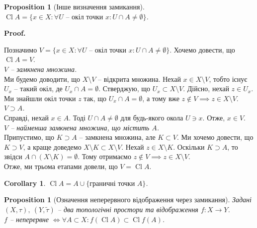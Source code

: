 \documentclass[a4paper, 10pt]{article}
\makeatletter
\theoremstyle{theoremdd}
\newtheorem{proposition}[theorem]{Proposition}
\newtheorem{corollary}[theorem]{Corollary}
\DeclareMathOperator{\Cl}{Cl}
\renewenvironment{proof}[1][Proof.\\]{\par
\pushQED{\hfill \qed}%
\normalfont \topsep6\p@\@plus6\p@\relax
\trivlist
\item\relax
{\bfseries
#1\@addpunct{.}}\hspace\labelsep\ignorespaces
}{%
\popQED\endtrivlist\@endpefalse
}
\makeatother
\begin{document}
\begin{proposition}[Інше визначення замикання]
$\Cl A = \{x \in X: \forall U \text{ -- окіл точки $x$}: U \cap A \neq \emptyset\}$.
\end{proposition}

\begin{proof}
Позначимо $V = \{x \in X: \forall U \text{ -- окіл точки $x$}: U \cap A \neq \emptyset\}$. Хочемо довести, що $\Cl A = V$.\\
\textit{$V$ -- замкнена множина.}\\
Ми будемо доводити, що $X \setminus V$ -- відкрита множина. Нехай $x \in X \setminus V$, тобто існує $U_x$ -- такий окіл, де $U_x \cap A = \emptyset$. Стверджую, що $U_x \subset X \setminus V$. Дійсно, нехай $z \in U_x$. Ми знайшли окіл точки $z$ так, що $U_x \cap A = \emptyset$, а тому вже $z \notin V \implies z \in X \setminus V$.\\
\textit{$V \supset A$.}\\
Справді, нехай $x \in A$. Тоді $U \cap A \neq \emptyset$ для будь-якого окола $U \ni x$. Отже, $x \in V$.\\
\textit{$V$ -- найменша замкнена множина, що містить $A$.}\\
Припустимо, що $K \supset A$ -- замкнена множина, але $K \subset V$. Ми хочемо довести, що $K \supset V$, а краще доведемо $X \setminus K \subset X \setminus V$. Нехай $z \in X \setminus K$. Оскільки $K \supset A$, то звідси $A \cap (X \setminus K) = \emptyset$. Тому отримаємо $z \notin V \implies z \in X \setminus V$.\\
Отже, ми трьома етапами довели, що $V = \Cl A$.
\end{proof}

\begin{corollary}
$\Cl A = A \cup \{ \text{граничні точки $A$} \}$.
\end{corollary}

\begin{proposition}[Означення неперервного відображення через замикання]
Задані $(X,\tau),\ (Y,\tilde{\tau})$ -- два топологічні простори та відображення $f \colon X \to Y$.\\
$f$ -- неперервне $\iff \forall A \subset X: f(\Cl A) \subset \Cl f(A)$.
\end{proposition}
\end{document}
